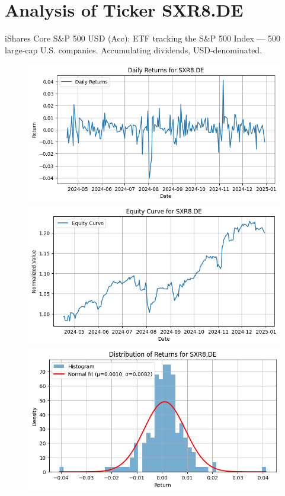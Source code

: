 \documentclass{article}%
\begin{document}
%
\section*{Analysis of Ticker SXR8.DE}%
\label{sec:AnalysisofTickerSXR8.DE}%
iShares Core S\&P 500 USD (Acc): ETF tracking the S\&P 500 Index — 500 large‑cap U.S. companies. Accumulating dividends, USD‑denominated.%


\begin{figure}[htbp]%
\begin{minipage}{0.31\textwidth}%
\includegraphics[width=\linewidth]{ticker_images/SXR8.DE_daily_returns.png}%
\end{minipage}%
\begin{minipage}{0.31\textwidth}%
\includegraphics[width=\linewidth]{ticker_images/SXR8.DE_equity_curve.png}%
\end{minipage}%
\begin{minipage}{0.31\textwidth}%
\includegraphics[width=\linewidth]{ticker_images/SXR8.DE_return_distribution.png}%
\end{minipage}%
\end{figure}
\end{document}
